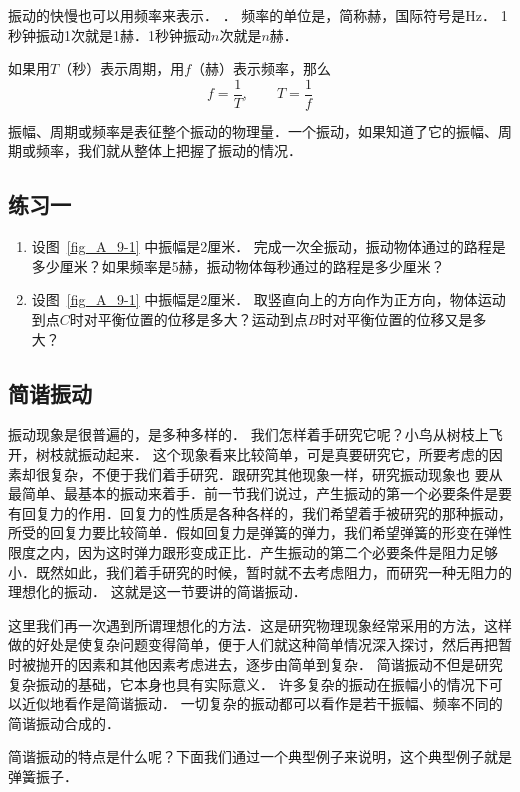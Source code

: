 振动的快慢也可以用频率来表示．
．
频率的单位是，简称赫，国际符号是Hz．
1秒钟振动1次就是1赫．1秒钟振动$n$次就是$n$赫．

如果用$T$（秒）表示周期，用$f$（赫）表示频率，那么
\[f=\frac{1}{T},\qquad T=\frac{1}{f}\]

振幅、周期或频率是表征整个振动的物理量．一个振动，如果知道了它的振幅、周期或频率，我们就从整体上把握了振动的情况．

\subsection*{练习一}
\begin{enumerate}
    \item 设图~\ref{fig_A_9-1} 中振幅是2厘米．
    完成一次全振动，振动物体通过的路程是多少厘米？如果频率是5赫，振动物体每秒通过的路程是多少厘米？
    \item 设图~\ref{fig_A_9-1} 中振幅是2厘米．
    取竖直向上的方向作为正方向，物体运动到点$C$时对平衡位置的位移是多大？运动到点$B$时对平衡位置的位移又是多大？
\end{enumerate}


\subsection{简谐振动}
振动现象是很普遍的，是多种多样的．
我们怎样着手研究它呢？小鸟从树枝上飞开，树枝就振动起来．
这个现象看来比较简单，可是真要研究它，所要考虑的因素却很复杂，不便于我们着手研究．跟研究其他现象一样，研究振动现象也
要从最简单、最基本的振动来着手．前一节我们说过，产生振动的第一个必要条件是要有回复力的作用．回复力的性质是各种各样的，我们希望着手被研究的那种振动，所受的回复力要比较简单．假如回复力是弹簧的弹力，我们希望弹簧的形变在弹性限度之内，因为这时弹力跟形变成正比．产生振动的第二个必要条件是阻力足够小．既然如此，我们着手研究的时候，暂时就不去考虑阻力，而研究一种无阻力的理想化的振动．
这就是这一节要讲的简谐振动．

这里我们再一次遇到所谓理想化的方法．这是研究物理现象经常采用的方法，这样做的好处是使复杂问题变得简单，便于人们就这种简单情况深入探讨，然后再把暂时被抛开的因素和其他因素考虑进去，逐步由简单到复杂．
简谐振动不但是研究复杂振动的基础，它本身也具有实际意义．
许多复杂的振动在振幅小的情况下可以近似地看作是简谐振动．
一切复杂的振动都可以看作是若干振幅、频率不同的简谐振动合成的．

简谐振动的特点是什么呢？下面我们通过一个典型例子来说明，这个典型例子就是弹簧振子．

